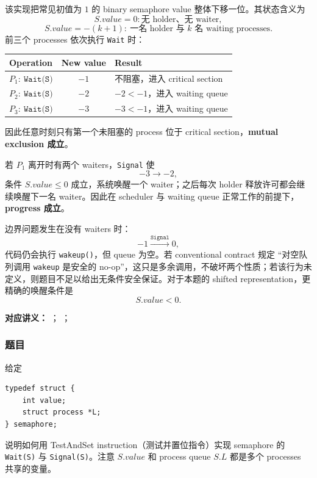 \begin{checkedsolution}
该实现把常见初值为 $1$ 的 binary semaphore value 整体下移一位。其状态含义为
\[
  S.value=0: \text{无 holder、无 waiter},
\]
\[
  S.value=-(k+1):\ \text{一名 holder 与 $k$ 名 waiting processes}.
\]
前三个 processes 依次执行 \texttt{Wait} 时：
\begin{center}
\small
\begin{tabular}{@{}lcl@{}}
  \toprule
  Operation & New value & Result \\
  \midrule
  $P_1:\ \texttt{Wait(S)}$ & $-1$ & 不阻塞，进入 critical section \\
  $P_2:\ \texttt{Wait(S)}$ & $-2$ & $-2<-1$，进入 waiting queue \\
  $P_3:\ \texttt{Wait(S)}$ & $-3$ & $-3<-1$，进入 waiting queue \\
  \bottomrule
\end{tabular}
\end{center}
因此任意时刻只有第一个未阻塞的 process 位于 critical section，\textbf{mutual exclusion 成立}。

若 $P_1$ 离开时有两个 waiters，\texttt{Signal} 使
\[
  -3\longrightarrow-2,
\]
条件 $S.value\le0$ 成立，系统唤醒一个 waiter；之后每次 holder 释放许可都会继续唤醒下一名 waiter。因此在 scheduler 与 waiting queue 正常工作的前提下，\textbf{progress 成立}。

边界问题发生在没有 waiters 时：
\[
  -1\xrightarrow{\texttt{Signal}}0,
\]
代码仍会执行 \texttt{wakeup()}，但 queue 为空。若 conventional contract 规定 ``对空队列调用 \texttt{wakeup} 是安全的 no-op''，这只是多余调用，不破坏两个性质；若该行为未定义，则题目不足以给出无条件安全保证。对于本题的 shifted representation，更精确的唤醒条件是
\[
  \boxed{S.value<0}.
\]
\end{checkedsolution}


\textbf{对应讲义：}
；
；

\subsubsection*{题目}

给定
\begin{verbatim}
typedef struct {
    int value;
    struct process *L;
} semaphore;
\end{verbatim}
说明如何用 TestAndSet instruction（测试并置位指令）实现 semaphore 的 \texttt{Wait(S)} 与 \texttt{Signal(S)}。注意 $S.value$ 和 process queue $S.L$ 都是多个 processes 共享的变量。

